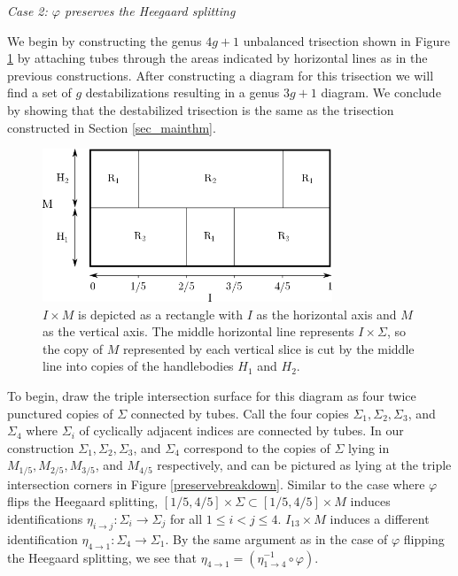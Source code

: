 \documentclass[12pt]{amsart}
\theoremstyle{definition}
\theoremstyle{remark}
\begin{document}
\smallskip
\noindent\textit{Case 2: $\varphi$ preserves the Heegaard splitting}\ \

We begin by constructing the genus $4g+1$ unbalanced trisection shown in Figure \ref{unbalancedbreakdown} by attaching tubes through the areas indicated by horizontal lines as in the previous constructions.
After constructing a diagram for this trisection we will find a set of $g$ destabilizations resulting in a genus $3g+1$ diagram.
We conclude by showing that the destabilized trisection is the same as the trisection constructed in Section \ref{sec_mainthm}.

\begin{figure}[h]
\centering
\includegraphics[height=1.8in]{MxS1_unbalanced.png}
\caption{$I \times M$ is depicted as a rectangle with $I$ as the horizontal axis and $M$ as the vertical axis.
The middle horizontal line represents $I \times \Sigma$, so the copy of $M$ represented by each vertical slice is cut by the middle line into copies of the handlebodies $H_1$ and $H_2$.}
\label{unbalancedbreakdown}
\end{figure}

To begin, draw the triple intersection surface for this diagram as four twice punctured copies of $\Sigma$ connected by tubes.
Call the four copies $\Sigma_1, \Sigma_2, \Sigma_3$, and $\Sigma_4$ where $\Sigma_i$ of cyclically adjacent indices are connected by tubes.
In our construction $\Sigma_1, \Sigma_2, \Sigma_3$, and $\Sigma_4$ correspond to the copies of $\Sigma$ lying in $M_{1/5}, M_{2/5}, M_{3/5}$, and $M_{4/5}$ respectively, and can be pictured as lying at the triple intersection corners in Figure \ref{preservebreakdown}.
Similar to the case where $\varphi$ flips the Heegaard splitting, $[1/5, 4/5] \times \Sigma \subset [1/5, 4/5] \times M$ induces identifications $\eta_{i \to j}\colon \Sigma_i \to \Sigma_j$ for all $1 \le i < j \le 4$.
$I_{13} \times M$ induces a different identification $\eta_{4 \to 1}\colon \Sigma_4 \to \Sigma_1$.
By the same argument as in the case of $\varphi$ flipping the Heegaard splitting, we see that $\eta_{4 \to 1} = (\eta_{1 \to 4}^{-1} \circ \varphi)$.
\end{document}
